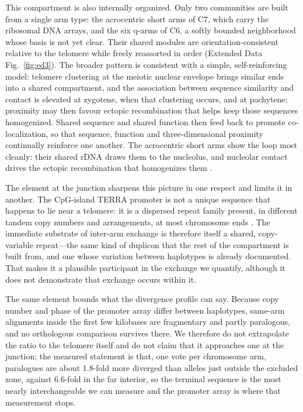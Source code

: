 \documentclass[pdflatex,mathphys]{jnl}
\begin{document}
This compartment is also internally organized. Only two communities are built from a single arm
type: the acrocentric short arms of C7, which carry the ribosomal DNA arrays, and the six q-arms of
C6, a softly bounded neighborhood whose basis is not yet clear. Their shared modules are
orientation-consistent relative to the telomere while freely reassorted in order
(Extended Data Fig.~\ref{fig:ed3}). The broader pattern is consistent with a simple,
self-reinforcing model: telomere clustering at the meiotic nuclear envelope brings similar ends
into a shared compartment, and the association between sequence similarity and contact is
elevated at zygotene, when that clustering occurs, and at pachytene; proximity may then favour ectopic
recombination that helps keep those sequences homogenized. Shared sequence and shared function then feed back to
promote co-localization, so that sequence, function and three-dimensional
proximity continually reinforce one another. The acrocentric short arms show
the loop most cleanly: their shared rDNA draws them to the nucleolus, and
nucleolar contact drives the ectopic recombination that homogenizes them
\cite{Guarracino2023}.

The element at the junction sharpens this picture in one respect and limits it in another. The
CpG-island TERRA promoter is not a unique sequence that happens to lie near a telomere: it is a
dispersed repeat family present, in different tandem copy numbers and arrangements, at most
chromosome ends \cite{Brown1990,Nergadze2009,Santagostino2025}. The immediate substrate of inter-arm
exchange is therefore itself a shared, copy-variable repeat---the same kind of duplicon that the rest
of the compartment is built from, and one whose variation between haplotypes is already documented.
That makes it a plausible participant in the exchange we quantify, although it does not demonstrate
that exchange occurs within it.

The same element bounds what the divergence profile can say. Because copy number and phase of the
promoter array differ between haplotypes, same-arm alignments inside the first few kilobases are
fragmentary and partly paralogous, and no orthologous comparison survives there. We therefore do not
extrapolate the ratio to the telomere itself and do not claim that it approaches one at the junction;
the measured statement is that, one vote per chromosome arm, paralogues are about 1.8-fold more
diverged than alleles just outside the excluded zone, against 6.6-fold in the far interior, so the
terminal sequence is the most nearly interchangeable we can measure and the promoter array is where
that measurement stops.
\end{document}
